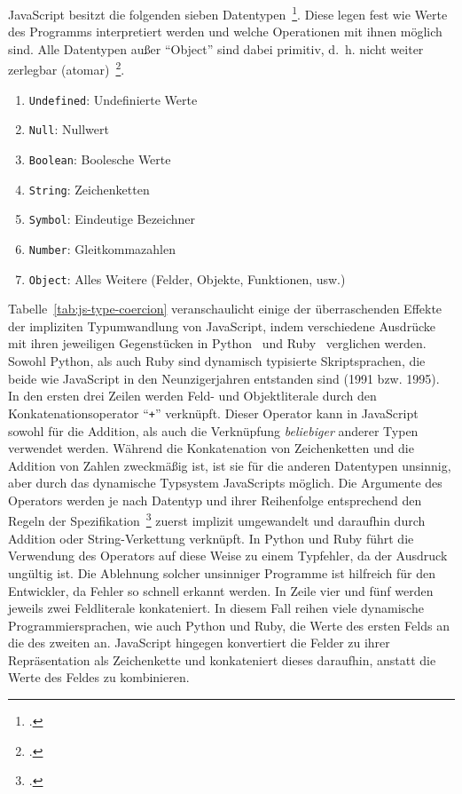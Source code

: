 JavaScript besitzt die folgenden sieben Datentypen~\footcite[Abschn.~6.1]{ECMASCRIPT:2019}.
Diese legen fest wie Werte des Programms interpretiert werden und welche Operationen mit ihnen möglich sind. Alle Datentypen außer \enquote{Object} sind dabei primitiv, d.~h. nicht weiter zerlegbar (atomar)~\footcite[Abschnitt 4.3.2]{ECMASCRIPT:2019}.

\begin{enumerate}
  \item \texttt{Undefined}: Undefinierte Werte
  \item \texttt{Null}: Nullwert
  \item \texttt{Boolean}: Boolesche Werte
  \item \texttt{String}: Zeichenketten
  \item \texttt{Symbol}: Eindeutige Bezeichner
  \item \texttt{Number}: Gleitkommazahlen
  \item \texttt{Object}: Alles Weitere (Felder, Objekte, Funktionen, usw.)
\end{enumerate}

Tabelle~\ref{tab:js-type-coercion} veranschaulicht einige der überraschenden Effekte der impliziten Typumwandlung von JavaScript, indem verschiedene Ausdrücke mit ihren jeweiligen Gegenstücken in Python~\autocite{PYTHON3} und Ruby~\autocite{RUBY} verglichen werden. Sowohl Python, als auch Ruby sind dynamisch typisierte Skriptsprachen, die beide wie JavaScript in den Neunzigerjahren entstanden sind (1991 bzw. 1995).
In den ersten drei Zeilen werden Feld- und Objektliterale durch den Konkatenationsoperator \enquote{\texttt{+}} verknüpft. Dieser Operator kann in JavaScript sowohl für die Addition, als auch die Verknüpfung \emph{beliebiger} anderer Typen verwendet werden. Während die Konkatenation von Zeichenketten und die Addition von Zahlen zweckmäßig ist, ist sie für die anderen Datentypen unsinnig, aber durch das dynamische Typsystem JavaScripts möglich. Die Argumente des Operators werden je nach Datentyp und ihrer Reihenfolge entsprechend den Regeln der Spezifikation~\footcite[Abschn.~12.8.3]{ECMASCRIPT:2019} zuerst implizit umgewandelt und daraufhin durch Addition oder String-Verkettung verknüpft. In Python und Ruby führt die Verwendung des Operators auf diese Weise zu einem Typfehler, da der Ausdruck ungültig ist. Die Ablehnung solcher unsinniger Programme ist hilfreich für den Entwickler, da Fehler so schnell erkannt werden.
In Zeile vier und fünf werden jeweils zwei Feldliterale konkateniert. In diesem Fall reihen viele dynamische Programmiersprachen, wie auch Python und Ruby, die Werte des ersten Felds an die des zweiten an. JavaScript hingegen konvertiert die Felder zu ihrer Repräsentation als Zeichenkette und konkateniert dieses daraufhin, anstatt die Werte des Feldes zu kombinieren.

